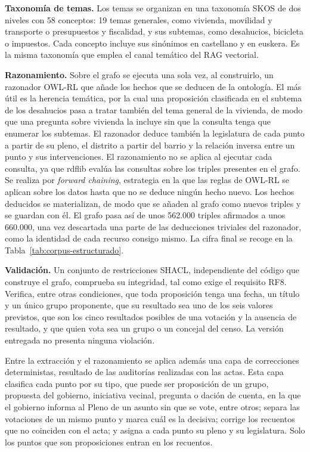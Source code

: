 \documentclass[11pt, a4paper]{report}
\begin{document}
	\textbf{Taxonomía de temas.} Los temas se organizan en una taxonomía SKOS de dos niveles con 58 conceptos: 19 temas generales, como vivienda, movilidad y transporte o presupuestos y fiscalidad, y sus subtemas, como desahucios, bicicleta o impuestos. Cada concepto incluye sus sinónimos en castellano y en euskera. Es la misma taxonomía que emplea el canal temático del RAG vectorial.

	\textbf{Razonamiento.} Sobre el grafo se ejecuta una sola vez, al construirlo, un razonador OWL-RL que añade los hechos que se deducen de la ontología. El más útil es la herencia temática, por la cual una proposición clasificada en el subtema de los desahucios pasa a tratar también del tema general de la vivienda, de modo que una pregunta sobre vivienda la incluye sin que la consulta tenga que enumerar los subtemas. El razonador deduce también la legislatura de cada punto a partir de su pleno, el distrito a partir del barrio y la relación inversa entre un punto y sus intervenciones. El razonamiento no se aplica al ejecutar cada consulta, ya que rdflib evalúa las consultas sobre los triples presentes en el grafo. Se realiza por \textit{forward chaining}, estrategia en la que las reglas de OWL-RL se aplican sobre los datos hasta que no se deduce ningún hecho nuevo. Los hechos deducidos se materializan, de modo que se añaden al grafo como nuevos triples y se guardan con él. El grafo pasa así de unos 562.000 triples afirmados a unos 660.000, una vez descartada una parte de las deducciones triviales del razonador, como la identidad de cada recurso consigo mismo. La cifra final se recoge en la Tabla~\ref{tab:corpus-estructurado}.

	\textbf{Validación.} Un conjunto de restricciones SHACL, independiente del código que construye el grafo, comprueba su integridad, tal como exige el requisito RF8. Verifica, entre otras condiciones, que toda proposición tenga una fecha, un título y un único grupo proponente, que su resultado sea uno de los seis valores previstos, que son los cinco resultados posibles de una votación y la ausencia de resultado, y que quien vota sea un grupo o un concejal del censo. La versión entregada no presenta ninguna violación.

	Entre la extracción y el razonamiento se aplica además una capa de
	correcciones deterministas, resultado de las auditorías realizadas con las
	actas. Esta capa clasifica cada punto por su tipo, que puede ser proposición
	de un grupo, propuesta del gobierno, iniciativa vecinal, pregunta o dación de cuenta, en la que el gobierno informa al Pleno de un
	asunto sin que se vote, entre otros; separa las votaciones de un mismo punto y marca cuál es
	la decisiva; corrige los recuentos que no coinciden con el acta; y asigna a
	cada punto su pleno y su legislatura. Solo los puntos que son proposiciones
	entran en los recuentos.
\end{document}
